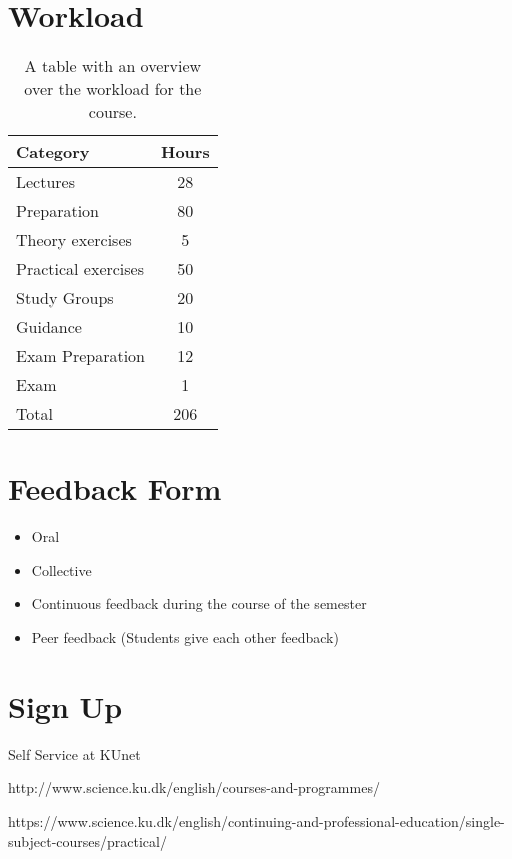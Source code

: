 \section{Workload}
\begin{table}[h]
    \centering
    \caption{A table with an overview over the workload for the course.}
    \label{tab:workload}
    \begin{tabular}{ l | c}
        \textbf{Category} & \textbf{Hours} \\ 
        \hline
        Lectures & 28 \\ 
        Preparation & 80 \\
        Theory exercises & 5 \\ 
        Practical exercises & 50 \\ 
        Study Groups & 20 \\
        Guidance & 10 \\
        Exam Preparation & 12 \\
        Exam & 1 \\ 
        \hline
        Total & 206 \\ 
    \end{tabular}
\end{table}

\section{Feedback Form}
\begin{highlight}
    \begin{itemize}
        \item Oral
        \item Collective
        \item Continuous feedback during the course of the semester
        \item Peer feedback (Students give each other feedback)
    \end{itemize}
\end{highlight}

\section{Sign Up}
Self Service at KUnet

http://www.science.ku.dk/english/courses-and-programmes/

https://www.science.ku.dk/english/continuing-and-professional-education/single-subject-courses/practical/

